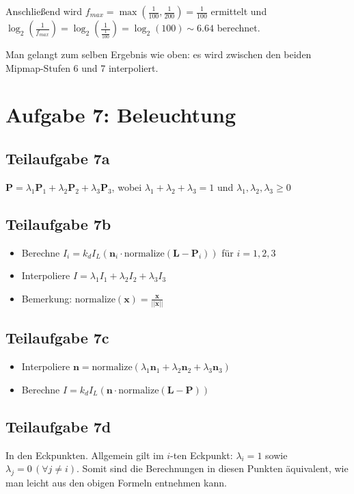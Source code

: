 \documentclass[a4paper]{scrartcl}
\begin{document}
Anschließend wird $f_{max} = \max(\frac{1}{100},\frac{1}{200}) = \frac{1}{100}$ ermittelt und $\log_2(\frac{1}{f_{max}}) = \log_2(\frac{1}{\frac{1}{100}}) = \log_2(100) \sim 6.64$ berechnet.

Man gelangt zum selben Ergebnis wie oben: es wird zwischen den beiden Mipmap-Stufen 6 und 7 interpoliert.

\clearpage
\section*{Aufgabe 7: Beleuchtung}
\subsection*{Teilaufgabe 7a}
$\mathbf{P} = \lambda_1 \mathbf{P}_1 + \lambda_2 \mathbf{P}_2 + \lambda_3 \mathbf{P}_3$, wobei $\lambda_1 + \lambda_2 + \lambda_3 = 1$
und $\lambda_1, \lambda_2, \lambda_3 \geq 0$

\subsection*{Teilaufgabe 7b}
\begin{itemize}
    \item Berechne $I_i = k_d I_L (\mathbf{n}_i \cdot \text{normalize}(\mathbf{L}-\mathbf{P}_i))$ für $i = 1,2,3$
    \item Interpoliere $I = \lambda_1 I_1 + \lambda_2 I_2 + \lambda_3 I_3$
    \item Bemerkung: $\text{normalize}(\mathbf{x}) = \frac{\mathbf{x}}{||\mathbf{x}||}$
\end{itemize}

\subsection*{Teilaufgabe 7c}
\begin{itemize}
    \item Interpoliere $\mathbf{n} = \text{normalize}(\lambda_1 \mathbf{n}_1 + \lambda_2 \mathbf{n}_2 + \lambda_3 \mathbf{n}_3)$
    \item Berechne $I = k_d I_L (\mathbf{n} \cdot \text{normalize}(\mathbf{L}-\mathbf{P}))$
\end{itemize}

\subsection*{Teilaufgabe 7d}
In den Eckpunkten. Allgemein gilt im $i$-ten Eckpunkt: $\lambda_i = 1$ sowie $\lambda_j = 0 \, (\forall j \neq i)$.
Somit sind die Berechnungen in diesen Punkten äquivalent, wie man leicht aus den obigen Formeln entnehmen kann.
\end{document}
